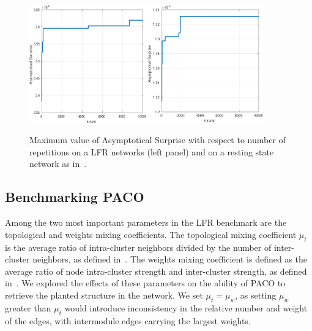 \noindent\begin{figure}[htb!]
\centering
\includegraphics[width=0.45\textwidth]{images/paco_variability_nreps_lfr.png}\includegraphics[width=0.45\textwidth]{images/paco_variability_nreps_bullmore.png}
\caption{Maximum value of Asymptotical Surprise with respect to number of repetitions on a LFR networks (left panel) and on a resting state network as in~\cite{crossley2013a}.}
\label{fig:paco_variability}
\end{figure}

\subsection{Benchmarking PACO}
Among the two most important parameters in the LFR benchmark are the topological and weights mixing coefficients. 
The topological mixing coefficient $\mu_t$ is the average ratio of intra-cluster neighbors divided by the number of inter-cluster neighbors, as defined in~\cite{lancichinetti2008}. The weights mixing coefficient is defined as the average ratio of node intra-cluster strength and inter-cluster strength, as defined in~\cite{lancichinetti2009a}.
We explored the effects of these parameters on the ability of PACO to retrieve the planted structure in the network.
We set $\mu_t=\mu_w$, as setting $\mu_w$ greater than $\mu_t$ would introduce inconsistency in the relative number and weight of the edges, with intermodule edges carrying the largest weights.

